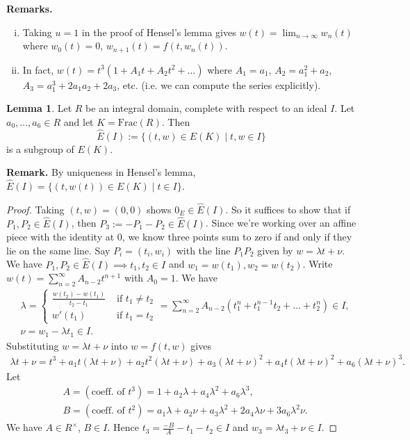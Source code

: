 \documentclass{article}
\theoremstyle{definition}
\newtheorem{lemma}[theorem]{Lemma}
\begin{document}
\vspace{1mm}
 
\textbf{Remarks.} 
\begin{enumerate}[(i)]
    \item Taking $u=1$ in the proof of Hensel's lemma gives $w(t) = \lim_{n \to \infty} w_n(t)$ where $w_0(t)=0$, $w_{n+1}(t) = f(t,w_n(t))$.
    \item In fact, $w(t) = t^3(1+A_1t + A_2t^2 + \ldots)$ where $A_1 = a_1$, $A_2 = a_1^2+a_2$, $A_3 = a_1^3 + 2a_1a_2 + 2a_3$, etc. (i.e. we can compute the series explicitly).
\end{enumerate} 
\begin{lemma}\label{lemma8.2}
    Let $R$ be an integral domain, complete with respect to an ideal $I$. Let $a_0,\ldots,a_6 \in R$ and let $K = \text{Frac}(R)$. Then \[
    \widehat{E}(I) := \{(t,w) \in E(K) \mid t,w \in I\}
    \]
    is a subgroup of $E(K)$.
\end{lemma}
\textbf{Remark.} By uniqueness in Hensel's lemma, $\widehat{E}(I) = \{(t,w(t)) \in E(K) \mid t \in I\}$.
\begin{proof}
    Taking $(t,w) = (0,0)$ shows $0_E \in \widehat{E}(I)$. So it suffices to show that if $P_1,P_2 \in \widehat{E}(I)$, then $P_3 := -P_1 - P_2 \in \widehat{E}(I)$. Since we're working over an affine piece with the identity at 0, we know three points sum to zero if and only if they lie on the same line. Say $P_i = (t_i,w_i)$ with the line $P_1P_2$ given by $w = \lambda t + \nu$. We have $P_1,P_2 \in \widehat{E}(I) \implies t_1,t_2 \in I$ and $w_1 = w(t_1), w_2=w(t_2)$. Write $w(t) = \sum_{n=2}^{\infty} A_{n-2}t^{n+1}$ with $A_0=1$. We have 
    \begin{align*}
        &\lambda = \begin{cases}
            \frac{w(t_2)-w(t_1)}{t_2-t_1} & \text{ if }t_1 \neq t_2\\
            w'(t_1) & \text{ if }t_1=t_2
        \end{cases} = \sum_{n=2}^{\infty} A_{n-2}(t_1^n + t_1^{n-1}t_2 + \ldots + t_2^n) \in I, \\
        &\nu = w_1-\lambda t_1 \in I.
    \end{align*}
    Substituting $w = \lambda t + \nu$ into $w = f(t,w)$ gives
    \begin{align*}
        \lambda t + \nu = t^3 + a_1 t(\lambda t + \nu) + a_2 t^2 (\lambda t + \nu) + a_3 (\lambda t + \nu)^2 + a_4 t (\lambda t + \nu)^2 + a_6 (\lambda t + \nu)^3.
    \end{align*}
    Let
    \begin{align*}
        &A = (\text{coeff. of }t^3) = 1 + a_2 \lambda + a_4 \lambda^2 + a_6 \lambda^3,\\
        &B = (\text{coeff. of }t^2) = a_1 \lambda + a_2 \nu + a_3 \lambda^2 + 2 a_4 \lambda \nu + 3 a_6 \lambda^2 \nu.
    \end{align*}
    We have $A \in R^\times$, $B \in I$. Hence $t_3 = \frac{-B}{A} - t_1 - t_2 \in I$ and $w_3 = \lambda t_3 + \nu \in I$.
\end{proof}
\end{document}
